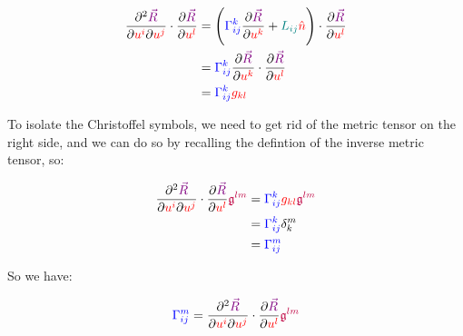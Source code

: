\begin{align*}
    \frac{\partial^2 \begingroup\color{violet}\vec{R}\endgroup}{\partial \begingroup\color{red}u^i\endgroup \partial\begingroup\color{red}u^j\endgroup} \cdot \frac{\partial \begingroup\color{violet}\vec{R}\endgroup}{\partial \begingroup\color{red}u^l\endgroup} &= 
    \left(\begingroup\color{blue}\Gamma^{k}_{ij}\endgroup \frac{\partial \begingroup\color{violet}\vec{R}\endgroup}{\partial \begingroup\color{red}u^k\endgroup} + \begingroup\color{teal}L_{ij}\endgroup \begingroup\color{red}\hat{n}\endgroup\right) \cdot \frac{\partial \begingroup\color{violet}\vec{R}\endgroup}{\partial \begingroup\color{red}u^l\endgroup}\\
    &= \begingroup\color{blue}\Gamma^{k}_{ij}\endgroup \frac{\partial \begingroup\color{violet}\vec{R}\endgroup}{\partial \begingroup\color{red}u^k\endgroup} \cdot \frac{\partial \begingroup\color{violet}\vec{R}\endgroup}{\partial \begingroup\color{red}u^l\endgroup}\\
    &= \begingroup\color{blue}\Gamma^{k}_{ij}\endgroup \begingroup\color{red}g_{kl}\endgroup
\end{align*}

To isolate the Christoffel symbols, we need to get rid of the metric tensor on the right side, and we can do so by recalling the defintion 
of the inverse metric tensor, so:

\begin{align*}
    \frac{\partial^2 \begingroup\color{violet}\vec{R}\endgroup}{\partial \begingroup\color{red}u^i\endgroup \partial\begingroup\color{red}u^j\endgroup} \cdot \frac{\partial \begingroup\color{violet}\vec{R}\endgroup}{\partial \begingroup\color{red}u^l\endgroup} \begingroup\color{purple}\mathfrak{g}^{lm}\endgroup &= 
    \begingroup\color{blue}\Gamma^{k}_{ij}\endgroup \begingroup\color{red}g_{kl}\endgroup\begingroup\color{purple}\mathfrak{g}^{lm}\endgroup\\
    &= \begingroup\color{blue}\Gamma^{k}_{ij}\endgroup \delta^{m}_k\\
    &= \begingroup\color{blue}\Gamma^{m}_{ij}\endgroup
\end{align*}

So we have:

\begin{equation}
    \begingroup\color{blue}\Gamma^{m}_{ij}\endgroup = \frac{\partial^2 \begingroup\color{violet}\vec{R}\endgroup}{\partial \begingroup\color{red}u^i\endgroup \partial\begingroup\color{red}u^j\endgroup} \cdot \frac{\partial \begingroup\color{violet}\vec{R}\endgroup}{\partial \begingroup\color{red}u^l\endgroup} \begingroup\color{purple}\mathfrak{g}^{lm}\endgroup
\end{equation}


